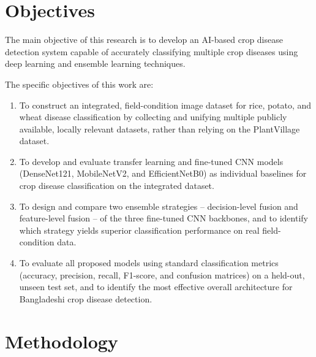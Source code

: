 
\section{Objectives}

The main objective of this research is to develop an AI-based crop disease detection system capable of accurately classifying multiple crop diseases using deep learning and ensemble learning techniques.

The specific objectives of this work are:

\begin{enumerate} \it
    \item To construct an integrated, field-condition image dataset for rice, potato, and wheat disease classification by collecting and unifying multiple publicly available, locally relevant datasets, rather than relying on the PlantVillage dataset.
    \item To develop and evaluate transfer learning and fine-tuned CNN models (DenseNet121, MobileNetV2, and EfficientNetB0) as individual baselines for crop disease classification on the integrated dataset.
    \item To design and compare two ensemble strategies -- decision-level fusion and feature-level fusion -- of the three fine-tuned CNN backbones, and to identify which strategy yields superior classification performance on real field-condition data.
    \item To evaluate all proposed models using standard classification metrics (accuracy, precision, recall, F1-score, and confusion matrices) on a held-out, unseen test set, and to identify the most effective overall architecture for Bangladeshi crop disease detection.
\end{enumerate}

\section{Methodology}

